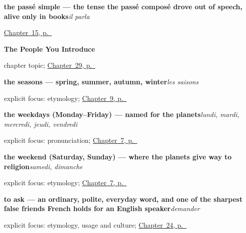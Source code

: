 \noindent\begin{minipage}[t]{\linewidth}
\raggedright
\textbf{the passé simple — the tense the passé composé drove out of speech, alive only in books}\enspace\emph{il parla}\par
\footnotesize \hyperref[ch:passe-compose]{Chapter~15, p.~\pageref*{ch:passe-compose}}
\end{minipage}\par\smallskip

\noindent\begin{minipage}[t]{\linewidth}
\raggedright
\textbf{The People You Introduce}\par
\footnotesize chapter topic; \hyperref[ch:fr-the-people-you-introduce]{Chapter~29, p.~\pageref*{ch:fr-the-people-you-introduce}}
\end{minipage}\par\smallskip

\noindent\begin{minipage}[t]{\linewidth}
\raggedright
\textbf{the seasons — spring, summer, autumn, winter}\enspace\emph{les saisons}\par
\footnotesize explicit focus: etymology; \hyperref[ch:months-seasons]{Chapter~9, p.~\pageref*{ch:months-seasons}}
\end{minipage}\par\smallskip

\noindent\begin{minipage}[t]{\linewidth}
\raggedright
\textbf{the weekdays (Monday–Friday) — named for the planets}\enspace\emph{lundi, mardi, mercredi, jeudi, vendredi}\par
\footnotesize explicit focus: pronunciation; \hyperref[ch:days]{Chapter~7, p.~\pageref*{ch:days}}
\end{minipage}\par\smallskip

\noindent\begin{minipage}[t]{\linewidth}
\raggedright
\textbf{the weekend (Saturday, Sunday) — where the planets give way to religion}\enspace\emph{samedi, dimanche}\par
\footnotesize explicit focus: etymology; \hyperref[ch:days]{Chapter~7, p.~\pageref*{ch:days}}
\end{minipage}\par\smallskip

\noindent\begin{minipage}[t]{\linewidth}
\raggedright
\textbf{to ask — an ordinary, polite, everyday word, and one of the sharpest false friends French holds for an English speaker}\enspace\emph{demander}\par
\footnotesize explicit focus: etymology, usage and culture; \hyperref[ch:fr-taking-asking-helping-loving]{Chapter~24, p.~\pageref*{ch:fr-taking-asking-helping-loving}}
\end{minipage}\par\smallskip

